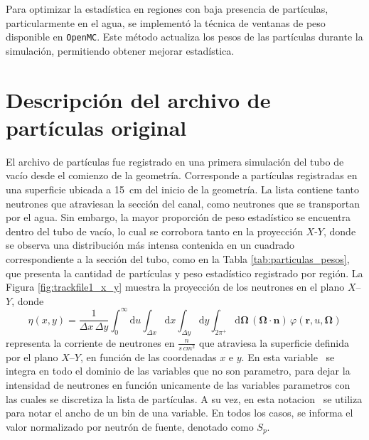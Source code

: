 Para optimizar la estadística en regiones con baja presencia de partículas, particularmente en el agua, se implementó la técnica de ventanas de peso disponible en \texttt{OpenMC}. Este método actualiza los pesos de las partículas durante la simulación, permitiendo obtener mejorar estadística.

\section{Descripción del archivo de partículas original} 

El archivo de partículas fue registrado en una primera simulación del tubo de vacío desde el comienzo de la geometría. Corresponde a partículas registradas en una superficie ubicada a 15~cm del inicio de la geometría. La lista contiene tanto neutrones que atraviesan la sección del canal, como neutrones que se transportan por el agua. Sin embargo, la mayor proporción de peso estadístico se encuentra dentro del tubo de vacío, lo cual se corrobora tanto en la proyección $X$-$Y$, donde se observa una distribución más intensa contenida en un cuadrado correspondiente a la sección del tubo, como en la Tabla \ref{tab:particulas_pesos}, que presenta la cantidad de partículas y peso estadístico registrado por región. La Figura \ref{fig:trackfile1_x_y} muestra la proyección de los neutrones en el plano $X$–$Y$, donde
\begin{equation}
\eta(x,y) = \frac{1}{\Delta x\,\Delta y}
\int_{0}^{\infty}\mathrm{d}u
\int_{\Delta x}\mathrm{d}x
\int_{\Delta y}\mathrm{d}y
\int_{2\pi^{+}} \mathrm{d}\mathbf{\Omega}\,(\mathbf{\Omega}\cdot \mathbf{n})
\,\varphi(\mathbf{r},u,\mathbf{\Omega})
\end{equation}
representa la corriente de neutrones en $\frac{n}{s \, {cm}^2}$ que atraviesa la superficie definida por el plano $X$–$Y$, en función de las coordenadas $x$ e $y$. En esta variable \eta~se integra en todo el dominio de las variables que no son parametro, para dejar la intensidad de neutrones en función unicamente de las variables parametros con las cuales se discretiza la lista de partículas. A su vez, en esta notacion \Delta~se utiliza para notar el ancho de un bin de una variable. En todos los casos, se informa el valor normalizado por neutrón de fuente, denotado como $S_p$. 

